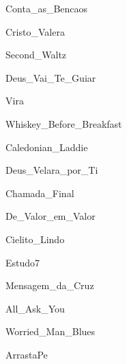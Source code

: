 \documentclass{scrartcl}
\begin{document}

{Conta_as_Bencaos}


{Cristo_Valera}


{Second_Waltz}


{Deus_Vai_Te_Guiar}


{Vira}


{Whiskey_Before_Breakfast}


{Caledonian_Laddie}


{Deus_Velara_por_Ti}


{Chamada_Final}


{De_Valor_em_Valor}


{Cielito_Lindo}


{Estudo7}


{Mensagem_da_Cruz}


{All_Ask_You}


{Worried_Man_Blues}


{ArrastaPe}
\end{document}
